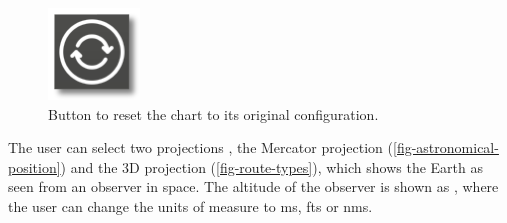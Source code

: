 \documentclass{ol-softwaremanual}
\begin{document}
\begin{figure}
  \includegraphics[width=\linewidth]{figures/reset-button.png}
  \caption{\label{fig-reset-button} Button to reset the chart to its original configuration.}
  \end{figure}

  The user can select two projections \cite{bowditch2002the}, the Mercator projection (\cref{fig-astronomical-position}) and the 3D projection (\cref{fig-route-types}), which shows the Earth as seen from an observer in space. The altitude of the observer is shown as , where the user can change the units of measure to \acp{m}, \acp{ft} or \acp{nm}. 

  \setlength\parfillskip{0pt}\par\setlength{}
\end{document}
